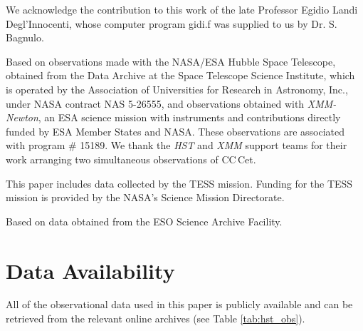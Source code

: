 \documentclass[fleqn,usenatbib]{mnras}
\begin{document}
We acknowledge the contribution to this work of the late Professor Egidio Landi Degl'Innocenti, whose computer program {\sc gidi.f} was supplied to us by Dr. S. Bagnulo.

Based on observations made with the NASA/ESA Hubble Space Telescope, obtained from the Data Archive at the Space Telescope Science Institute, which is operated by the Association of Universities for Research in Astronomy, Inc., under NASA contract NAS 5-26555, and observations obtained with \textit{XMM-Newton}, an ESA science mission with instruments and contributions directly funded by ESA Member States and NASA. These observations are associated with program \# 15189. We thank the {\em HST} and {\em XMM} support teams for their work arranging two simultaneous observations of CC\,Cet.

This paper includes data collected by the TESS mission. Funding for the TESS mission is provided by the NASA's Science Mission Directorate.

Based on data obtained from the ESO Science Archive Facility.

\section{Data Availability}
All of the observational data used in this paper is publicly available and can be retrieved from the relevant online archives (see Table \ref{tab:hst_obs}).








\end{document}
